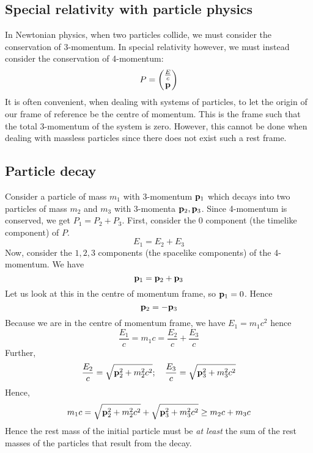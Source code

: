 \subsection{Special relativity with particle physics}
In Newtonian physics, when two particles collide, we must consider the conservation of 3-momentum.
In special relativity however, we must instead consider the conservation of 4-momentum:
\[
	P = \begin{pmatrix}
		\frac{E}{c} \\ \vb p
	\end{pmatrix}
\]
It is often convenient, when dealing with systems of particles, to let the origin of our frame of reference be the centre of momentum.
This is the frame such that the total 3-momentum of the system is zero.
However, this cannot be done when dealing with massless particles since there does not exist such a rest frame.

\subsection{Particle decay}
Consider a particle of mass \(m_1\) with 3-momentum \(\vb p_1\) which decays into two particles of mass \(m_2\) and \(m_3\) with 3-momenta \(\vb p_2, \vb p_3\).
Since 4-momentum is conserved, we get \(P_1 = P_2 + P_3\).
First, consider the 0 component (the timelike component) of \(P\).
\[
	E_1 = E_2 + E_3
\]
Now, consider the \(1, 2, 3\) components (the spacelike components) of the 4-momentum.
We have
\[
	\vb p_1 = \vb p_2 + \vb p_3
\]
Let us look at this in the centre of momentum frame, so \(\vb p_1 = 0\).
Hence
\[
	\vb p_2 = -\vb p_3
\]
Because we are in the centre of momentum frame, we have \(E_1 = m_1 c^2\) hence
\[
	\frac{E_1}{c} = m_1 c = \frac{E_2}{c} + \frac{E_3}{c}
\]
Further,
\[
	\frac{E_2}{c} = \sqrt{\vb p_2^2 + m_2^2 c^2};\quad \frac{E_3}{c} = \sqrt{\vb p_3^2 + m_3^2 c^2}
\]
Hence,
\[
	m_1 c = \sqrt{\vb p_2^2 + m_2^2 c^2} + \sqrt{\vb p_3^2 + m_3^2 c^2} \geq m_2 c + m_3 c
\]
Hence the rest mass of the initial particle must be \textit{at least} the sum of the rest masses of the particles that result from the decay.

